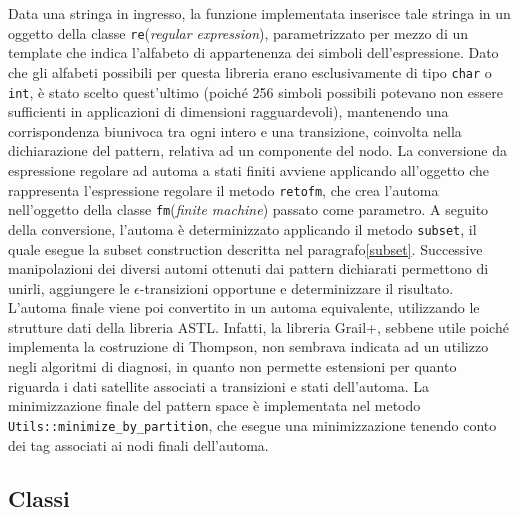 Data una stringa in ingresso, la funzione implementata inserisce tale stringa in un oggetto della classe \verb|re|(\emph{regular expression}), parametrizzato per mezzo di un template che indica l'alfabeto di appartenenza dei simboli dell'espressione. 
Dato che gli alfabeti possibili per questa libreria erano esclusivamente di tipo \verb|char| o \verb|int|, è stato scelto quest'ultimo (poiché 256 simboli possibili potevano non essere sufficienti in applicazioni di dimensioni ragguardevoli), mantenendo una corrispondenza biunivoca tra ogni intero e una transizione, coinvolta nella dichiarazione del pattern, relativa ad un componente del nodo. La conversione da espressione regolare ad automa a stati finiti avviene applicando all'oggetto che rappresenta l'espressione regolare il metodo \verb|retofm|, che crea l'automa nell'oggetto della classe \verb|fm|(\emph{finite machine}) passato come parametro. A seguito della conversione, l'automa è determinizzato applicando il metodo \verb|subset|, il quale esegue la subset construction descritta nel paragrafo\ref{subset}.
Successive manipolazioni dei diversi automi ottenuti dai pattern dichiarati permettono di unirli, aggiungere le $\epsilon$-transizioni opportune e determinizzare il risultato. L'automa finale viene poi convertito in un automa equivalente, utilizzando le strutture dati della libreria ASTL. Infatti, la libreria Grail+, sebbene utile poiché implementa la costruzione di Thompson, non sembrava indicata ad un utilizzo negli algoritmi di diagnosi, in quanto non permette estensioni per quanto riguarda i dati satellite associati a transizioni e stati dell'automa.
La minimizzazione finale del pattern space è implementata nel metodo \verb|Utils::minimize_by_partition|, che esegue una minimizzazione tenendo conto dei tag associati ai nodi finali dell'automa.

\subsection{Classi}


